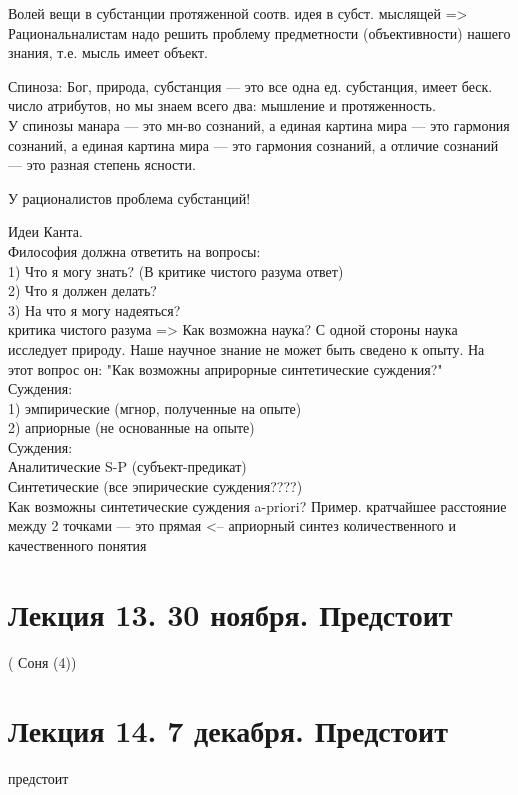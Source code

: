 \documentclass[a4paper,12pt]{article}
\begin{document}
Волей вещи в субстанции протяженной соотв. идея в субст. мыслящей => Рациональналистам надо решить проблему предметности (объективности) нашего знания, т.е. мысль имеет объект.

Спиноза: Бог, природа, субстанция --- это все одна ед. субстанция, имеет беск. число атрибутов, но мы знаем всего два: мышление и протяженность.\\
У спинозы манара --- это мн-во сознаний, а единая картина мира --- это гармония сознаний, а единая картина мира --- это гармония сознаний, а отличие сознаний --- это разная степень ясности.

У рационалистов проблема субстанций!

Идеи Канта.\\
Философия должна ответить на вопросы:\\
1) Что я могу знать? (В критике чистого разума ответ)\\
2) Что я должен делать? \\
3) На что я могу надеяться? \\
критика чистого разума => Как возможна наука? С одной стороны наука исследует природу. Наше научное знание не может быть сведено к опыту. На этот вопрос он: "Как возможны априрорные синтетические суждения?"\\
Суждения: \\
1) эмпирические (мгнор, полученные на опыте)\\
2) априорные (не основанные на опыте)\\
Суждения: \\
Аналитические S-P (субъект-предикат)\\
Синтетические (все эпирические суждения????)\\
Как возможны синтетические суждения a-priori?
Пример. кратчайшее расстояние между 2 точками --- это прямая <-- априорный синтез количественного и качественного понятия

\section{Лекция 13. 30 ноября. Предстоит} 
( Соня (4))
\section{Лекция 14. 7 декабря. Предстоит} предстоит
\end{document}
